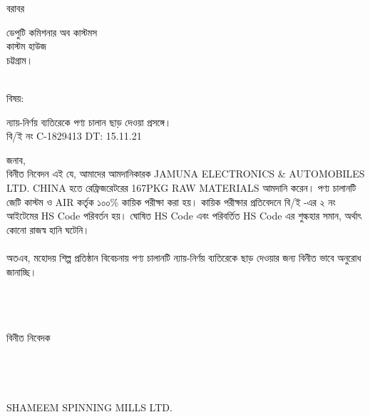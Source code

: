 \documentclass[12pt]{article}
\newcommand{\beno}{C-1829413}
\newcommand{\bedt}{15.11.21}
\newcommand{\co}{CHINA}
\newcommand{\pkg}{167PKG}
\newcommand{\good}{RAW MATERIALS}
\newcommand{\impn}{JAMUNA ELECTRONICS \& AUTOMOBILES LTD.}
\newcommand{\cnfn}{SHAMEEM SPINNING MILLS LTD.}
\begin{document}
\noindent
বরাবর
\\
\begin{minipage}[t]{0.05\linewidth}
\hspace{1em}
\end{minipage}
\begin{minipage}[t]{0.95\linewidth}
ডেপুটি কমিশনার অব কাস্টমস
\\
কাস্টম হাউজ
\\
চট্টগ্রাম।
\\
\\
\end{minipage}
\begin{minipage}[t]{0.08\linewidth}
বিষয়:
\end{minipage}
\begin{minipage}[t]{0.92\linewidth}
ন্যায়-নির্ণয় ব্যতিরেকে পণ্য চালান ছাড় দেওয়া প্রসঙ্গে।
\\
বি/ই নং {\beno} DT: {\bedt}
\\
\end{minipage}
জনাব,
\\
\hspace*{2.5em}বিনীত নিবেদন এই যে, আমাদের আমদানিকারক {\impn}
{\co} হতে রেফ্রিজরেটরের {\pkg} {\good} আমদানি করেন। পণ্য চালানটি জেটি কাস্টম ও AIR কর্তৃক ১০০\% কায়িক পরীক্ষা করা হয়। কায়িক পরীক্ষার প্রতিবেদনে বি/ই -এর ২ নং আইটেমের HS Code পরিবর্তন হয়। ঘোষিত HS Code এবং পরিবর্তিত  HS Code এর শুল্কহার সমান, অর্থাৎ কোনো রাজস্ব হানি ঘটেনি।
\\
\\
অতএব, মহোদয় শিল্প প্রতিষ্ঠান বিবেচনায় পণ্য চালানটি ন্যায়-নির্ণয়
ব্যতিরেকে ছাড় দেওয়ার জন্য বিনীত ভাবে অনুরোধ জানাচ্ছি।
\\
\\
\\
\\
\begin{minipage}[t]{0.50\linewidth}
\hspace{1em}
\end{minipage}
\begin{minipage}[t]{0.60\linewidth}
বিনীত নিবেদক
\\
\\
\\
\\
\\
{\cnfn}
\end{minipage}
\thispagestyle{laststyle}
\end{document}
